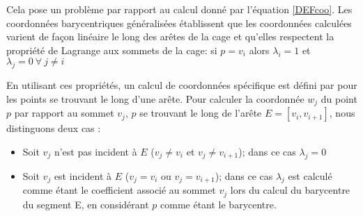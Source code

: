 Cela pose un problème par rapport au calcul donné par l'équation \ref{DEFcoo}.
Les coordonnées barycentriques généralisées établissent que les coordonnées
calculées varient de façon linéaire le long des arêtes de la cage et qu'elles
respectent la propriété de Lagrange aux sommets de la cage: si $p = v_i$ alors
$\lambda_i = 1$ et $\lambda_j = 0 ~\forall~ j \neq i$

En utilisant ces propriétés, un calcul de coordonnées spécifique est défini
par \cite{HF06} pour les points se trouvant le long d'une arête. Pour calculer
la coordonnée $w_j$ du point $p$ par rapport au sommet $v_j$, $p$ se trouvant
le long de l'arête $E = [v_i,v_{i+1}]$, nous distinguons deux cas :

\begin{itemize}

\item Soit $v_j$ n'est pas incident à $E$ ($v_j \neq v_i$ et $v_j \neq
v_{i+1}$); dans ce cas $\lambda_j = 0$

\item Soit $v_j$ est incident à $E$ ($v_j = v_i$ ou $v_j = v_{i+1}$); dans ce
cas $\lambda_j$ est calculé comme étant le coefficient associé au sommet $v_j$
lors du calcul du barycentre du segment E, en considérant $p$ comme étant le
barycentre.

\end{itemize}